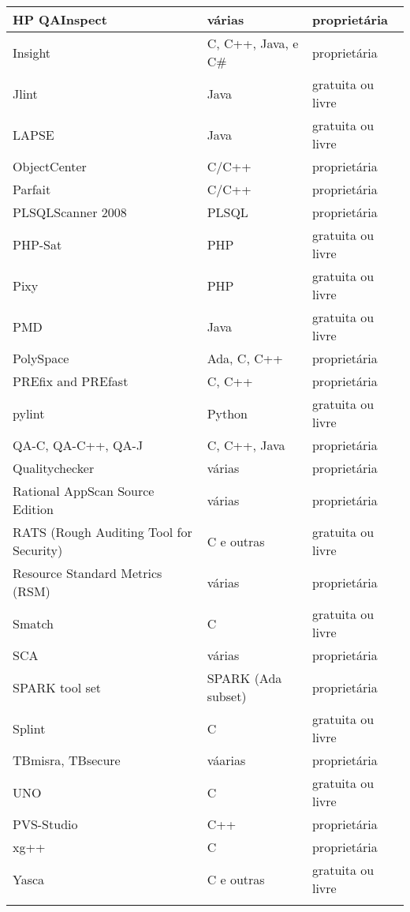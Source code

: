 \begin{center}
\begin{longtable}{ l | l | l }
HP QAInspect &  várias   & proprietária \\ \hline
Insight &   C, C++, Java, e C\#  & proprietária \\ \hline
Jlint &   Java  & gratuita ou livre \\ \hline
LAPSE &   Java  & gratuita ou livre \\ \hline
ObjectCenter &  C/C++  & proprietária \\ \hline
Parfait &   C/C++  & proprietária \\ \hline
PLSQLScanner 2008 &   PLSQL   & proprietária \\ \hline
PHP-Sat &   PHP   & gratuita ou livre \\ \hline
Pixy &  PHP   & gratuita ou livre \\ \hline
PMD &   Java  & gratuita ou livre \\ \hline
PolySpace &   Ada, C, C++   & proprietária \\ \hline
PREfix and PREfast &  C, C++  & proprietária \\ \hline
pylint &  Python  & gratuita ou livre \\ \hline
QA-C, QA-C++, QA-J &  C, C++, Java  & proprietária \\ \hline
Qualitychecker &  várias   & proprietária \\ \hline
Rational AppScan Source Edition &   várias  & proprietária \\ \hline
RATS (Rough Auditing Tool for Security) &   C e outras   & gratuita ou livre \\ \hline
Resource Standard Metrics (RSM) &   várias  & proprietária \\ \hline
Smatch &  C   & gratuita ou livre \\ \hline
SCA &   várias & proprietária \\ \hline
SPARK tool set &  SPARK (Ada subset)  & proprietária \\ \hline
Splint &  C   & gratuita ou livre \\ \hline
TBmisra, TBsecure &  váarias  & proprietária \\ \hline
UNO &   C   & gratuita ou livre \\ \hline
PVS-Studio &  C++   & proprietária \\ \hline
xg++ &  C   & proprietária \\ \hline
Yasca &   C e outras & gratuita ou livre \\
        \hline
        
        \label{tabela_ferramentas}
        \end{longtable}

        \end{center}
